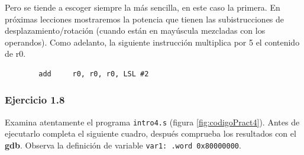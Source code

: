 Pero se tiende a escoger siempre la más sencilla, en este caso la primera. En
próximas lecciones mostraremos la potencia que tienen las subistrucciones de
desplazamiento/rotación (cuando están en mayúscula mezcladas con los operandos).
Como adelanto, la siguiente instrucción multiplica por 5 el contenido de r0.

\begin{lstlisting}
        add     r0, r0, r0, LSL #2
\end{lstlisting}

\subsubsection{Ejercicio 1.8}
Examina atentamente el programa {\tt intro4.s} (figura \ref{fig:codigoPract4}).
Antes de ejecutarlo completa el siguiente cuadro, después comprueba los resultados con
el {\bf gdb}. Observa la definición de variable {\tt var1: .word 0x80000000}.

